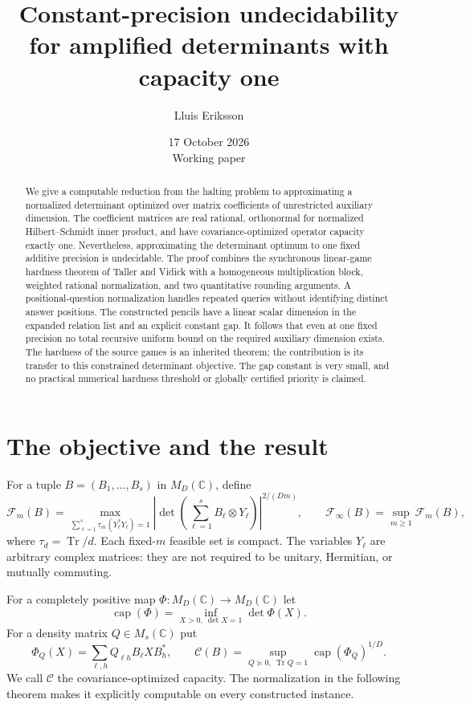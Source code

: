 \documentclass[11pt,a4paper]{article}
\title{Constant-precision undecidability for amplified determinants with capacity one}
\author{Lluis Eriksson}
\date{17 October 2026\\Working paper}
\newcommand{\C}{\mathbb C}
\newcommand{\Tr}{\operatorname{Tr}}
\newcommand{\capop}{\operatorname{cap}}
\newcommand{\F}{\mathcal F}
\newcommand{\K}{\mathcal C}
\begin{document}
\maketitle
\begin{abstract}
We give a computable reduction from the halting problem to approximating a normalized determinant optimized over matrix coefficients of unrestricted auxiliary dimension. The coefficient matrices are real rational, orthonormal for normalized Hilbert--Schmidt inner product, and have covariance-optimized operator capacity exactly one. Nevertheless, approximating the determinant optimum to one fixed additive precision is undecidable. The proof combines the synchronous linear-game hardness theorem of Taller and Vidick with a homogeneous multiplication block, weighted rational normalization, and two quantitative rounding arguments. A positional-question normalization handles repeated queries without identifying distinct answer positions. The constructed pencils have a linear scalar dimension in the expanded relation list and an explicit constant gap. It follows that even at one fixed precision no total recursive uniform bound on the required auxiliary dimension exists. The hardness of the source games is an inherited theorem; the contribution is its transfer to this constrained determinant objective. The gap constant is very small, and no practical numerical hardness threshold or globally certified priority is claimed.
\end{abstract}

\section{The objective and the result}
For a tuple $B=(B_1,\ldots,B_s)$ in $M_D(\C)$, define
\begin{equation}
 \F_m(B)=
 \max_{\sum_{\ell=1}^s\tau_m(Y_\ell^*Y_\ell)=1}
 \left|\det\!\left(\sum_{\ell=1}^s B_\ell\otimes Y_\ell\right)\right|^{2/(Dm)},
 \qquad
 \F_\infty(B)=\sup_{m\ge1}\F_m(B),                         \label{eq:objective}
\end{equation}
where $\tau_d=\Tr/d$. Each fixed-$m$ feasible set is compact. The variables $Y_\ell$ are arbitrary complex matrices: they are not required to be unitary, Hermitian, or mutually commuting.

For a completely positive map $\Phi:M_D(\C)\to M_D(\C)$ let
\[
 \capop(\Phi)=\inf_{X>0,\ \det X=1}\det\Phi(X).
\]
For a density matrix $Q\in M_s(\C)$ put
\[
 \Phi_Q(X)=\sum_{\ell,h}Q_{\ell h}B_\ell X B_h^*,
 \qquad
 \K(B)=\sup_{Q\succeq0,\ \Tr Q=1}\capop(\Phi_Q)^{1/D}.
\]
We call $\K$ the covariance-optimized capacity. The normalization in the following theorem makes it explicitly computable on every constructed instance.
\end{document}
